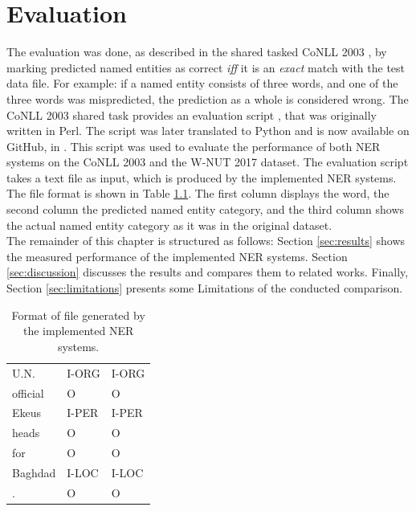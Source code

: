 \documentclass[12pt]{book}
\begin{document}
	\chapter{Evaluation}
	\label{chap:evaluation}
	
	The evaluation was done, as described in the shared tasked CoNLL 2003 \cite{tjongkimsang2003conll}, by marking predicted named entities as correct \textit{iff} it is an \textit{exact} match with the test data file. For example: if a named entity consists of three words, and one of the three words was mispredicted, the prediction as a whole is considered wrong.
	The CoNLL 2003 shared task provides an evaluation script \cite{conllevalperl}, that was originally written in Perl. The script was later translated to Python and is now available on GitHub, in \cite{conlleval}. This script was used to evaluate the performance of both NER systems on the CoNLL 2003 and the W-NUT 2017 dataset. The evaluation script takes a text file as input, which is produced by the implemented NER systems. The file format is shown in Table \ref{tab:evalformat}. The first column displays the word, the second column the predicted named entity category, and the third column shows the actual named entity category as it was in the original dataset. \\
	
	The remainder of this chapter is structured as follows: Section \ref{sec:results} shows the measured performance of the implemented NER systems. Section \ref{sec:discussion} discusses the results and compares them to related works. Finally, Section \ref{sec:limitations} presents some Limitations of the conducted comparison.
	
	
	\begin{center}
		\begin{table}
			\centering
			\begin{tabular}{l l l}
				U.N. & I-ORG & I-ORG \\
				official & O & O \\
				Ekeus & I-PER & I-PER \\ 
				heads & O & O \\
				for & O & O \\
				Baghdad & I-LOC & I-LOC \\ 
				. & O & O \\
			\end{tabular}
			\caption{Format of file generated by the implemented NER systems.}
			\label{tab:evalformat}
		\end{table}
	\end{center}
		
\end{document}
